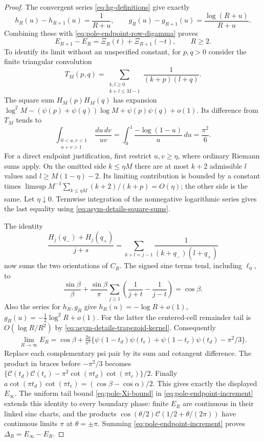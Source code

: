 \begin{proof}
The convergent series \eqref{eq:hg-definitions} give exactly
\[
 h_R(u)-h_{R+1}(u)=\frac1{R+u},\qquad
 g_R(u)-g_{R+1}(u)=\frac{\log(R+u)}{R+u}.
\]
Combining these with \eqref{eq:pole-endpoint-row-digamma} proves
\begin{equation}\label{eq:pole-endpoint-increment}
 E_{R+1}-E_R=\Xi_R(t)+\Xi_{R+1}(-t),\qquad R\geq2.
\end{equation}
To identify its limit without an unspecified constant, for $p,q>0$
consider the finite triangular convolution
\[
 T_M(p,q)=\sum_{\substack{k,l\geq0\\k+l\leq M-1}}
                   \frac1{(k+p)(l+q)}.
\]
The square sum $H_M(p)H_M(q)$ has expansion
$\log^2M-(\psi(p)+\psi(q))\log M+\psi(p)\psi(q)+o(1)$.
Its difference from $T_M$ tends to
\[
 \int_{\substack{0<u,v<1\\u+v>1}}\frac{du\,dv}{uv}
       =\int_0^1\frac{-\log(1-u)}u\,du=\frac{\pi^2}{6}.
\]
For a direct endpoint justification, first restrict $u,v\geq\eta$,
where ordinary Riemann sums apply.  On the omitted side $k\leq\eta M$
there are at most $k+2$ admissible $l$ values and
$l\geq M(1-\eta)-2$.  Its limiting contribution is bounded by
a constant times $\limsup M^{-1}\sum_{k\leq\eta M}(k+2)/(k+p)
=O(\eta)$; the other side is the same.  Let $\eta\downarrow0$.
Termwise integration of the nonnegative logarithmic series gives the
last equality using \eqref{eq:asym-details-square-sums}.

The identity
\[
 \frac{H_j(q_-)+H_j(q_+)}{j+s}
       =\sum_{k+l=j-1}\frac1{(k+q_-)(l+q_+)}
\]
now sums the two orientations of $C_R$.  The signed sine terms tend,
including $\ell_0$, to
\[
 \frac{\sin\beta}{\beta}+
 \frac{\sin\beta}{\pi}\sum_{j\geq1}
       \left(\frac1{j+t}-\frac1{j-t}\right)=\cos\beta.
\]
Also the series for $h_R,g_R$ give
$h_R(u)=-\log R+o(1)$,
$g_R(u)=-\tfrac12\log^2R+o(1)$.
For the latter the centered-cell remainder tail is
$O(\log R/R^2)$ by \eqref{eq:asym-details-trapezoid-kernel}.
Consequently
\begin{align*}
 \lim_{R\to\infty}E_R
 =\cos\beta+\frac{2a}{\pi^2}
 \bigl\{\psi(1-t_d)\psi(t_e)+\psi(1-t_e)\psi(t_d)-\pi^2/3\bigr\}.
\end{align*}
Replace each complementary psi pair by its sum and cotangent
difference.  The product in braces before $-\pi^2/3$ becomes
$\{\mathcal C(t_d)\mathcal C(t_e)
-\pi^2\cot(\pi t_d)\cot(\pi t_e)\}/2$.
Finally
$a\cot(\pi t_d)\cot(\pi t_e)=(\cos\beta-\cos\alpha)/2$.
This gives exactly the displayed $E_\infty$.
The uniform tail bound \eqref{eq:pole-Xi-bound} in
\eqref{eq:pole-endpoint-increment} extends this identity to every
boundary phase: finite $E_R$ are continuous in their linked sinc
charts, and the products
$\cos(\theta/2)\mathcal C(1/2+\theta/(2\pi))$
have continuous limits $\pi$ at $\theta=\pm\pi$.
Summing \eqref{eq:pole-endpoint-increment} proves
$\Delta_R=E_\infty-E_R$.


\end{proof}
